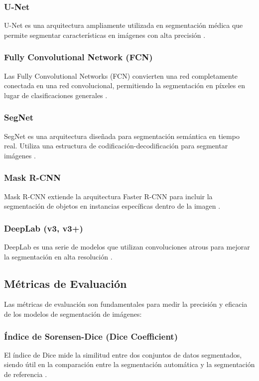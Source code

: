 \subsubsection{U-Net}
U-Net es una arquitectura ampliamente utilizada en segmentación médica que permite segmentar características en imágenes con alta precisión \cite{autor2020unet}.

\subsubsection{Fully Convolutional Network (FCN)}
Las Fully Convolutional Networks (FCN) convierten una red completamente conectada en una red convolucional, permitiendo la segmentación en píxeles en lugar de clasificaciones generales \cite{autor2019fcn}.

\subsubsection{SegNet}
SegNet es una arquitectura diseñada para segmentación semántica en tiempo real. Utiliza una estructura de codificación-decodificación para segmentar imágenes \cite{autor2021segnet}.

\subsubsection{Mask R-CNN}
Mask R-CNN extiende la arquitectura Faster R-CNN para incluir la segmentación de objetos en instancias específicas dentro de la imagen \cite{autor2022maskrcnn}.

\subsubsection{DeepLab (v3, v3+)}
DeepLab es una serie de modelos que utilizan convoluciones atrous para mejorar la segmentación en alta resolución \cite{autor2021deeplab}.

\subsection{Métricas de Evaluación}
Las métricas de evaluación son fundamentales para medir la precisión y eficacia de los modelos de segmentación de imágenes:

\subsubsection{Índice de Sorensen-Dice (Dice Coefficient)}
El índice de Dice mide la similitud entre dos conjuntos de datos segmentados, siendo útil en la comparación entre la segmentación automática y la segmentación de referencia \cite{autor2020dice}.

